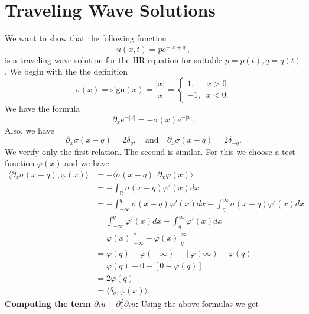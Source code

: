 \documentclass[12pt,reqno]{amsart}
\numberwithin{equation}{section}  %
\numberwithin{figure}{section}
\newcommand{\rr}{\mathbb{R}}
\newcommand{\p}{\partial}
\theoremstyle{plain}  %
\theoremstyle{definition}
\begin{document}
\section{Traveling Wave Solutions} 
\label{sec:trav-wav-soln}
We want to show that the following function
%
\begin{equation}
  \label{trav-wav-HR-trav}
  u(x,t)= p e^{-| x + q |}, 
\end{equation}
%
is a traveling wave solution for the HR equation for suitable $p=p(t),
q=q(t)$. We begin with the the definition
%
\begin{equation}
  \label{sign-funct}
  \sigma(x) \doteq \text{sign}(x) = \frac{|x|}{x} 
  = 
  \begin{cases}
    1, \; \; \; \; \; x > 0 \\
    -1, \; \; x < 0.
  \end{cases}
\end{equation}
%
We have the formula
% 
%
\begin{equation}
  \label{sign-deriv1}
  \p_x e^{-|x|}= -\sigma(x) e^{-|x|}.
\end{equation}
%
Also,  we have 
%
\begin{equation}
  \label{sign-deriv2}
  \p_x\sigma(x-q) = 2\delta_q,
  \quad
  \text{and}
  \quad
  \p_x\sigma(x+q) = 2\delta_{-q}.
\end{equation}
%
We verify only the first relation. The second is similar.
For this we choose a test function $\varphi(x)$ and we have
%
\begin{align*}
  \langle
  \p_x\sigma(x-q), \varphi(x)
  \rangle
  &=
  -\langle
  \sigma(x-q),  \p_x\varphi(x)
  \rangle
  \\
  &=
  -
  \int_\rr
  \sigma(x-q) \varphi'(x) dx 
  \\
  &=
  -
  \int_{-\infty}^q
  \sigma(x-q) \varphi'(x) dx 
  -
  \int_q^\infty
  \sigma(x-q) \varphi'(x) dx 
  \\
  &=
  \int_{-\infty}^q \varphi'(x) dx 
  -
  \int_q^\infty \varphi'(x) dx 
  \\
  &=
  \varphi(x)\Big|_{-\infty}^q
  -
  \varphi(x)\Big|_q^\infty 
  \\
  &=
  \varphi(q)- \varphi(-\infty) 
  -
  [\varphi(\infty)- \varphi(q) ]
  \\
  &=
  \varphi(q)- 0
  -
  [0- \varphi(q) ]
  \\
  &=
  2\varphi(q)
  \\
  &=
  \langle
  \delta_q, \varphi(x)
  \rangle.
\end{align*}
{\bf  Computing the term $\p_t u-\p_{x}^2\p_t u$:}  Using the above formulas we get
\end{document}
